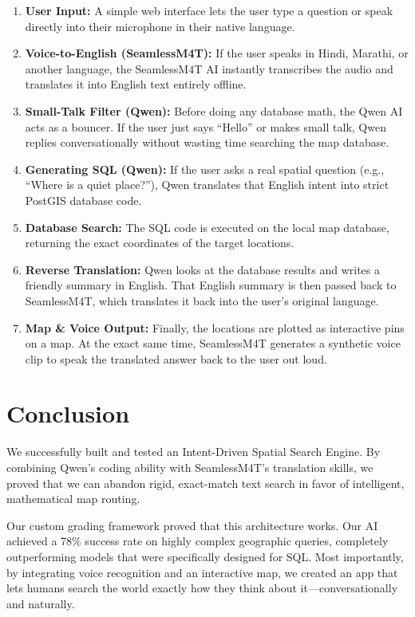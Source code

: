 \documentclass[11pt,a4paper]{article}
\begin{document}
\begin{enumerate}
    \item \textbf{User Input:} A simple web interface lets the user type a question or speak directly into their microphone in their native language.
    \item \textbf{Voice-to-English (SeamlessM4T):} If the user speaks in Hindi, Marathi, or another language, the SeamlessM4T AI instantly transcribes the audio and translates it into English text entirely offline.
    \item \textbf{Small-Talk Filter (Qwen):} Before doing any database math, the Qwen AI acts as a bouncer. If the user just says ``Hello'' or makes small talk, Qwen replies conversationally without wasting time searching the map database.
    \item \textbf{Generating SQL (Qwen):} If the user asks a real spatial question (e.g., ``Where is a quiet place?''), Qwen translates that English intent into strict PostGIS database code.
    \item \textbf{Database Search:} The SQL code is executed on the local map database, returning the exact coordinates of the target locations.
    \item \textbf{Reverse Translation:} Qwen looks at the database results and writes a friendly summary in English. That English summary is then passed back to SeamlessM4T, which translates it back into the user's original language.
    \item \textbf{Map \& Voice Output:} Finally, the locations are plotted as interactive pins on a map. At the exact same time, SeamlessM4T generates a synthetic voice clip to speak the translated answer back to the user out loud.
\end{enumerate}

\section{Conclusion}

We successfully built and tested an Intent-Driven Spatial Search Engine. By combining Qwen's coding ability with SeamlessM4T's translation skills, we proved that we can abandon rigid, exact-match text search in favor of intelligent, mathematical map routing.

Our custom grading framework proved that this architecture works. Our AI achieved a 78\% success rate on highly complex geographic queries, completely outperforming models that were specifically designed for SQL. Most importantly, by integrating voice recognition and an interactive map, we created an app that lets humans search the world exactly how they think about it---conversationally and naturally.
\end{document}
